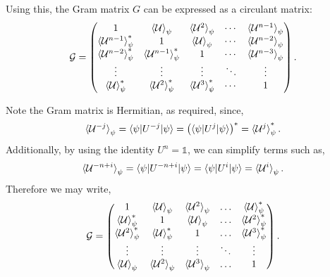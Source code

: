 \documentclass[12pt,letterpaper]{article}
\begin{document}
\begin{multicols}{2}
Using this, the Gram matrix $G$ can be expressed as a circulant matrix:
\begin{align*}
	\mathcal{G} = \begin{pmatrix}
 1 & \braket{\mathcal{U}}_{\psi} & \braket{\mathcal{U}^2}_{\psi} & \cdots & \braket{\mathcal{U}^{n-1}}_{\psi} \\
 \braket{\mathcal{U}^{n-1}}_{\psi}^* & 1 & \braket{\mathcal{U}}_{\psi} & \cdots & \braket{\mathcal{U}^{n-2}}_{\psi} \\
 \braket{\mathcal{U}^{n-2}}_{\psi}^* & \braket{\mathcal{U}^{n-1}}_{\psi}^* & 1 & \cdots & \braket{\mathcal{U}^{n-3}}_{\psi} \\
 \vdots & \vdots & \vdots & \ddots & \vdots \\
 \braket{\mathcal{U}}_{\psi}^* & \braket{\mathcal{U}^{2}}_{\psi}^* & \braket{\mathcal{U}^{3}}_{\psi}^* & \cdots & 1
\end{pmatrix}.
\end{align*}

Note the Gram matrix is Hermitian, as required, since,
\begin{align*}
    \braket{\mathcal{U}^{-j}}_{\psi} = \braket{\psi | U^{-j} | \psi} = \left(\braket{\psi | U^j | \psi}\right)^* = \braket{\mathcal{U}^j}_{\psi}^*.
\end{align*}
Additionally, by using the identity $U^n = \mathds{1}$, we can simplify terms such as,
\begin{align*}
    \braket{\mathcal{U}^{-n+i}}_\psi = \braket{\psi | U^{-n+i} | \psi} = \braket{\psi | U^i | \psi} = \braket{\mathcal{U}^i}_\psi.
\end{align*}
Therefore we may write,
\begin{align}
	\mathcal{G}=\begin{pmatrix}
 1 & \braket{\mathcal{U}}_{\psi} & \braket{\mathcal{U}^{2}}_{\psi} & \hdots &  \braket{\mathcal{U}}_{\psi}^* \\
  \braket{\mathcal{U}}_{\psi}^* & 1 & \braket{\mathcal{U}}_{\psi} & \hdots &  \braket{\mathcal{U}^{2}}_{\psi}^* \\
    \braket{\mathcal{U}^{2}}_{\psi}^* &  \braket{\mathcal{U}}_{\psi}^*  & 1 & \hdots &  \braket{\mathcal{U}^{3}}_{\psi}^* \\
   \vdots & \vdots & \vdots & \ddots & \vdots \\
  \braket{\mathcal{U}}_{\psi} & \braket{\mathcal{U}^{2}}_{\psi}  & \braket{\mathcal{U}^{3}}_{\psi}  & \hdots &  1 
\end{pmatrix}.
\end{align}


\end{multicols}
\end{document}
